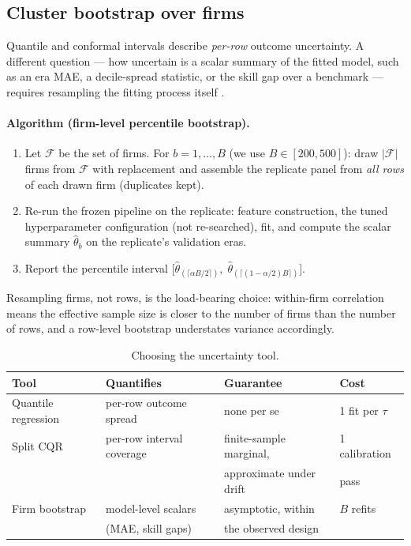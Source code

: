 \subsection{Cluster bootstrap over firms}

Quantile and conformal intervals describe \emph{per-row} outcome uncertainty. A
different question --- how uncertain is a scalar summary of the fitted model, such as an
era MAE, a decile-spread statistic, or the skill gap over a benchmark --- requires
resampling the fitting process itself \cite{efron1994}.

\paragraph{Algorithm (firm-level percentile bootstrap).}
\begin{enumerate}
\item Let $\mathcal{F}$ be the set of firms. For $b = 1, \dots, B$ (we use
$B \in [200, 500]$): draw $|\mathcal{F}|$ firms from $\mathcal{F}$ with replacement and
assemble the replicate panel from \emph{all rows} of each drawn firm (duplicates kept).
\item Re-run the frozen pipeline on the replicate: feature construction, the tuned
hyperparameter configuration (not re-searched), fit, and compute the scalar summary
$\hat\theta_b$ on the replicate's validation eras.
\item Report the percentile interval
$\bigl[\hat\theta_{(\lceil \alpha B/2 \rceil)},\;
\hat\theta_{(\lceil (1-\alpha/2) B \rceil)}\bigr]$.
\end{enumerate}
Resampling firms, not rows, is the load-bearing choice: within-firm correlation means
the effective sample size is closer to the number of firms than the number of rows, and
a row-level bootstrap understates variance accordingly.

\begin{table}[htbp]
\centering
\caption{Choosing the uncertainty tool.}
\label{tab:xgb-uqtools}
\begin{tabular}{@{}llll@{}}
\toprule
Tool & Quantifies & Guarantee & Cost \\
\midrule
Quantile regression & per-row outcome spread & none per se & 1 fit per $\tau$ \\
Split CQR & per-row interval coverage & finite-sample marginal, & 1 calibration \\
 & & approximate under drift & pass \\
Firm bootstrap & model-level scalars & asymptotic, within & $B$ refits \\
 & (MAE, skill gaps) & the observed design & \\
\bottomrule
\end{tabular}
\end{table}


